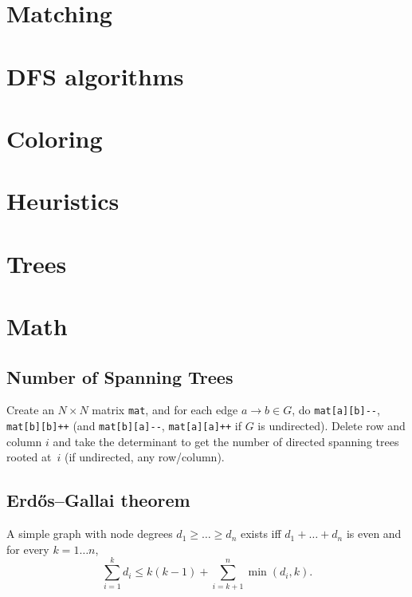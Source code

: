 \section{Matching}

\section{DFS algorithms}

\section{Coloring}

\section{Heuristics}

\section{Trees}

\section{Math}
	\subsection{Number of Spanning Trees}
		Create an $N\times N$ matrix \texttt{mat}, and for each edge $a \rightarrow b \in G$, do
		\texttt{mat[a][b]-{}-}, \texttt{mat[b][b]++} (and \texttt{mat[b][a]-{}-}, \texttt{mat[a][a]++} if $G$ is undirected).
		Delete row and column $i$ and take the determinant to get the number of directed spanning trees rooted at~$i$ (if undirected, any row/column).

	\subsection{Erdős–Gallai theorem}
		A simple graph with node degrees $d_1 \ge \dots \ge d_n$ exists iff $d_1 + \dots + d_n$ is even and for every $k = 1\dots n$,
		\[ \sum _{i=1}^{k}d_{i}\leq k(k-1)+\sum _{i=k+1}^{n}\min(d_{i},k). \]
